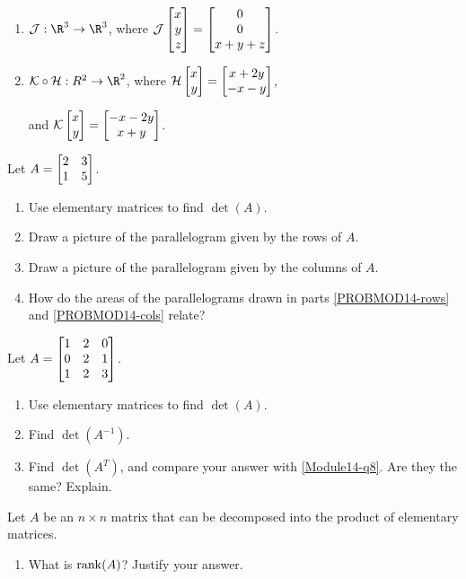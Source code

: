\begin{exercises}
\begin{problist}
\begin{enumerate}
			\item $\mathcal J:\R^{3}\to\R^{3}$, where
				$\mathcal J\mat{x\\y\\z}=\matc{0\\0\\x+y+z}$.

			\item $\mathcal K\circ \mathcal H:R^{2}\to\R^{2}$, where
				$\mathcal H\mat{x\\y}=\matc{x+2y\\-x-y}$,

				and $\mathcal K\mat{x\\y}=\matc{-x-2y\\x+y}$.
		\end{enumerate}

		\prob Let $A=\mat{2&3\\1&5}$.
		\begin{enumerate}
			\item Use elementary matrices to find $\det(A)$.

			\item Draw a picture of the parallelogram given by the rows
				of $A$.
				\label{PROBMOD14-rows}

			\item Draw a picture of the parallelogram given by the columns
				of $A$.
				\label{PROBMOD14-cols}
			\item How do the areas of the parallelograms drawn in parts \ref{PROBMOD14-rows} and
				\ref{PROBMOD14-cols} relate?
		\end{enumerate}

		\prob Let $A=\mat{1&2&0\\0&2&1\\1&2&3}$.
		\begin{enumerate}
			\item \label{Module14-q8} Use elementary matrices to
				find $\det(A)$.

			\item Find $\det(A^{-1})$.

			\item Find $\det(A^{T})$, and compare your answer with
				\ref{Module14-q8}. Are they the same? Explain.
		\end{enumerate}

		\prob Let $A$ be an $n \times n$ matrix that can be decomposed into
		the product of elementary matrices.
		\begin{enumerate}
			\item What is $\operatorname{rank}(A)$? Justify your answer.


\end{enumerate}
\end{problist}
\end{exercises}
